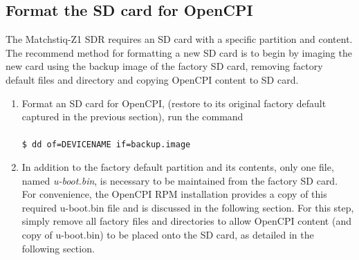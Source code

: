 \subsection{Format the SD card for OpenCPI}
The Matchstiq-Z1 SDR requires an SD card with a
specific partition and content. The recommend method for formatting a new SD card is to begin by imaging the new card using the backup image of the factory SD card, removing factory default files and directory and copying OpenCPI content to SD card.
\begin{enumerate}
	\item Format an SD card for OpenCPI, (restore to its original factory default captured in the previous section), run the command \\ \\
	\texttt{\$ dd of=DEVICENAME if=backup.image}
	\item In addition to the factory default partition and its contents, only one file, named \textit{u-boot.bin}, is necessary to be maintained from the factory SD card.
For convenience, the OpenCPI RPM installation provides a copy of this required u-boot.bin file and is discussed in the following section. For this step, simply remove all factory files and directories to allow OpenCPI content (and copy of u-boot.bin) to be placed onto the SD card, as detailed in the following section.
\end{enumerate}

